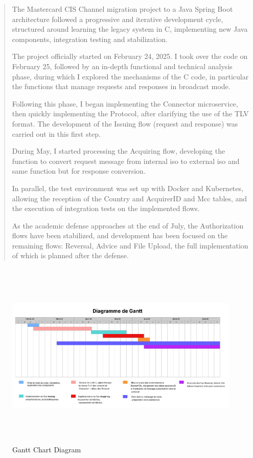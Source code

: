 \documentclass[12pt,a4paper]{report}
\begin{document}
\begin{quote}
The Mastercard CIS Channel migration project to a Java Spring Boot
architecture followed a progressive and iterative development cycle,
structured around learning the legacy system in C, implementing new Java
components, integration testing and stabilization.

The project officially started on February 24, 2025. I took over the
code on February 25, followed by an in-depth functional and technical
analysis phase, during which I explored the mechanisms of the C code, in
particular the functions that manage requests and responses in broadcast
mode.

Following this phase, I began implementing the Connector microservice,
then quickly implementing the Protocol, after clarifying the use of the
TLV format. The development of the Issuing flow (request and response)
was carried out in this first step.

During May, I started processing the Acquiring flow, developing the
function to convert request message from internal iso to external iso
and same function but for response conversion.

In parallel, the test environment was set up with Docker and Kubernetes,
allowing the reception of the Country and AcquirerID and Mcc tables, and
the execution of integration tests on the implemented flows.

As the academic defense approaches at the end of July, the Authorization
flows have been stabilized, and development has been focused on the
remaining flows: Reversal, Advice and File Upload, the full
implementation of which is planned after the defense.
\end{quote}

\begin{figure}[H]
\centering
\includegraphics[width=6.31605in,height=3.54559in]{media/image34.png}
\caption{Gantt Chart Diagram}
\label{fig:gantt}
\end{figure}
\end{document}
